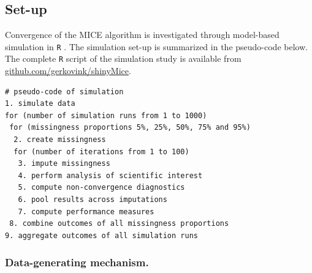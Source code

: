 \documentclass[Royal,times,sageh]{sagej}
\begin{document}
\hypertarget{set-up}{%
\subsection{Set-up}\label{set-up}}

Convergence of the MICE algorithm is investigated through model-based simulation in \texttt{R} \citep[version 3.6.3;][]{R}. The simulation set-up is summarized in the pseudo-code below. The complete \texttt{R} script of the simulation study is available from \href{https://github.com/gerkovink/shinyMice/tree/master/3.Thesis/1.SimulationStudy}{github.com/gerkovink/shinyMice}.

\begin{verbatim}
# pseudo-code of simulation 
1. simulate data 
for (number of simulation runs from 1 to 1000)
 for (missingness proportions 5%, 25%, 50%, 75% and 95%)
  2. create missingness
  for (number of iterations from 1 to 100)
   3. impute missingness
   4. perform analysis of scientific interest
   5. compute non-convergence diagnostics 
   6. pool results across imputations
   7. compute performance measures
 8. combine outcomes of all missingness proportions
9. aggregate outcomes of all simulation runs 
\end{verbatim}

\hypertarget{data-generating-mechanism.}{%
\subsubsection{Data-generating mechanism.}\label{data-generating-mechanism.}}
\end{document}
